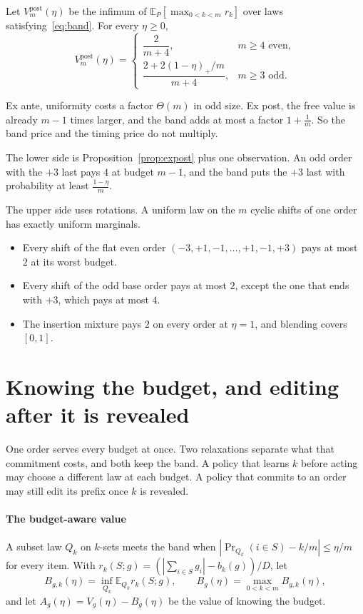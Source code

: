 \begin{theorem}
\label{thm:expostband}
Let $V^{\mathrm{post}}_{m}(\eta)$ be the infimum of $\mathbb{E}_{P}[\max_{0<k<m}r_{k}]$ over laws
satisfying~\eqref{eq:band}. For every $\eta\ge0$,
\[
V^{\mathrm{post}}_{m}(\eta)=
\begin{cases}
\dfrac{2}{m+4}, & m\ge4\text{ even},\\[8pt]
\dfrac{2+2(1-\eta)_{+}/m}{m+4}, & m\ge3\text{ odd}.
\end{cases}
\]
\end{theorem}


Ex ante, uniformity costs a factor $\Theta(m)$ in odd size. Ex post, the free value is
already $m-1$ times larger, and the band adds at most a factor $1+\frac1m$. So the band price
and the timing price do not multiply.

The lower side is Proposition~\ref{prop:expost} plus one observation. An odd order with the
$+3$ last pays $4$ at budget $m-1$, and the band puts the $+3$ last with probability at least
$\frac{1-\eta}{m}$.

The upper side uses rotations. A uniform law on the $m$ cyclic shifts of one order has exactly
uniform marginals.
\begin{itemize}
\item Every shift of the flat even order $(-3,+1,-1,\dots,+1,-1,+3)$ pays at most $2$ at its
worst budget.
\item Every shift of the odd base order pays at most $2$, except the one that ends with $+3$,
which pays at most $4$.
\item The insertion mixture pays $2$ on every order at $\eta=1$, and blending covers $[0,1]$.
\end{itemize}

\section{Knowing the budget, and editing after it is revealed}
\label{sec:aware}

One order serves every budget at once. Two relaxations separate what that commitment costs,
and both keep the band. A policy that learns $k$ before acting may choose a different law at
each budget. A policy that commits to an order may still edit its prefix once $k$ is revealed.

\paragraph{The budget-aware value} A subset law $Q_{k}$ on $k$-sets meets the band when
$|\Pr_{Q_{k}}(i\in S)-k/m|\le\eta/m$ for every item. With
$r_{k}(S;g)=(|\sum_{i\in S}g_{i}|-b_{k}(g))/D$, let
\[
B_{g,k}(\eta)=\inf_{Q_{k}}\mathbb{E}_{Q_{k}}r_{k}(S;g),\qquad
B_{g}(\eta)=\max_{0<k<m}B_{g,k}(\eta),
\]
and let $A_{g}(\eta)=V_{g}(\eta)-B_{g}(\eta)$ be the value of knowing the budget.

